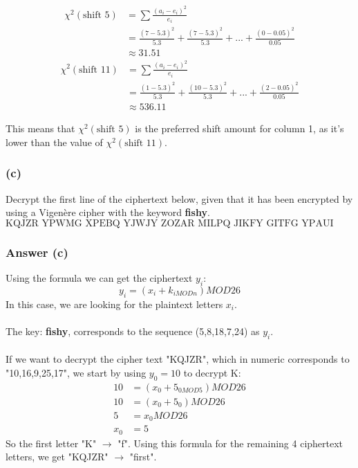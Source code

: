 \documentclass{article}
\begin{document}
	\[
	\begin{split}
	\chi^2(\text{shift } 5) &=\sum\frac{(a_i-e_i)^2}{e_i}  \\
	&= \frac{(7-5.3)^2}{5.3} + \frac{(7-5.3)^2}{5.3} + ... + \frac{(0-0.05)^2}{0.05} \\
	&\approx 31.51
	\end{split}
	\]
	\[
	\begin{split}
	\chi^2(\text{shift } 11) &=\sum\frac{(a_i-e_i)^2}{e_i}  \\
	&= \frac{(1-5.3)^2}{5.3} + \frac{(10-5.3)^2}{5.3} + ... + \frac{(2-0.05)^2}{0.05} \\
	&\approx 536.11
	\end{split}
	\]
	
	This means that $\chi^2(\text{shift } 5)$ is the preferred shift amount for column 1, as it's lower than the value of $\chi^2(\text{shift } 11)$.
	
	\subsubsection*{(c)}
	Decrypt the first line of the ciphertext below, given that it has been encrypted by
	using a Vigenère cipher with the keyword \textbf{fishy}.
	$$
	\text{KQJZR YPWMG XPEBQ YJWJY ZOZAR MILPQ JIKFY GITFG YPAUI HWMSB MINLA FCYOR}
	$$
	
	\subsubsection*{Answer (c)}
	Using the formula we can get the ciphertext $y_i$:
	$$
	y_i = (x_i + k_{i MOD n}) MOD 26
	$$
	In this case, we are looking for the plaintext letters $x_i$.
	\\\\
	The key: \textbf{fishy}, corresponds to the sequence (5,8,18,7,24) as $y_i$. 
	\\\\
	If we want to decrypt the cipher text "KQJZR", which in numeric corresponds to "10,16,9,25,17", we start by using $y_0 = 10$ to decrypt K:
	\[
	\begin{split}
	10 	&= (x_0 + 5_{0 MOD 5}) MOD 26 \\
	10	&= (x_0 + 5_0) MOD 26 \\
	5	&= x_0 MOD 26 \\
	x_0 &= 5
	\end{split}
	\]
	So the first letter "K" $\rightarrow$ "f". Using this formula for the remaining 4 ciphertext letters, we get "KQJZR" $\rightarrow$ "first".
	
	
\end{document}
